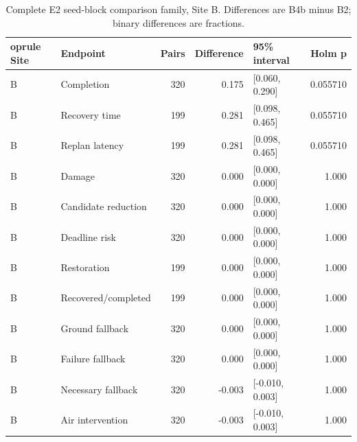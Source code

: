\begin{table}[H]\centering\footnotesize
\caption{Complete E2 seed-block comparison family, Site B. Differences are B4b minus B2; binary differences are fractions.}\label{tab:e2_B}
\begin{tabularx}{\textwidth}{@{}lYrrYr@{}}	oprule
Site & Endpoint & Pairs & Difference & 95\% interval & Holm p \\\midrule
B & Completion & 320 & 0.175 & [0.060, 0.290] & 0.055710 \\
B & Recovery time & 199 & 0.281 & [0.098, 0.465] & 0.055710 \\
B & Replan latency & 199 & 0.281 & [0.098, 0.465] & 0.055710 \\
B & Damage & 320 & 0.000 & [0.000, 0.000] & 1.000 \\
B & Candidate reduction & 320 & 0.000 & [0.000, 0.000] & 1.000 \\
B & Deadline risk & 320 & 0.000 & [0.000, 0.000] & 1.000 \\
B & Restoration & 199 & 0.000 & [0.000, 0.000] & 1.000 \\
B & Recovered/completed & 199 & 0.000 & [0.000, 0.000] & 1.000 \\
B & Ground fallback & 320 & 0.000 & [0.000, 0.000] & 1.000 \\
B & Failure fallback & 320 & 0.000 & [0.000, 0.000] & 1.000 \\
B & Necessary fallback & 320 & -0.003 & [-0.010, 0.003] & 1.000 \\
B & Air intervention & 320 & -0.003 & [-0.010, 0.003] & 1.000 \\
\bottomrule\end{tabularx}\end{table}
